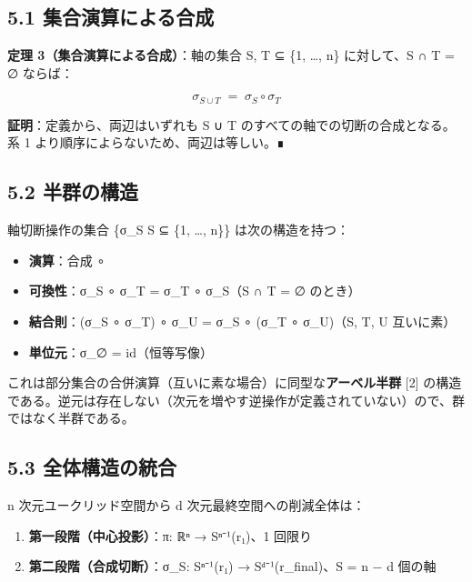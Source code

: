 \documentclass[a4paper,11pt]{ltjsarticle}
\theoremstyle{definition}
\theoremstyle{remark}
\providecommand{\tightlist}{%
  \setlength{\itemsep}{0pt}\setlength{\parskip}{0pt}}
\begin{document}
\subsection{5.1
集合演算による合成}\label{ux96c6ux5408ux6f14ux7b97ux306bux3088ux308bux5408ux6210}

\textbf{定理 3（集合演算による合成）}：軸の集合 S, T ⊆ \{1, \ldots, n\}
に対して、S ∩ T = ∅ ならば：

\[
\sigma_{S \cup T} \;=\; \sigma_S \circ \sigma_T
\]

\textbf{証明}：定義から、両辺はいずれも S ∪ T
のすべての軸での切断の合成となる。系 1
より順序によらないため、両辺は等しい。∎

\subsection{5.2 半群の構造}\label{ux534aux7fa4ux306eux69cbux9020}

軸切断操作の集合 \{σ\_S \textbar{} S ⊆ \{1, \ldots, n\}\}
は次の構造を持つ：

\begin{itemize}
\tightlist
\item
  \textbf{演算}：合成 ∘
\item
  \textbf{可換性}：σ\_S ∘ σ\_T = σ\_T ∘ σ\_S（S ∩ T = ∅ のとき）
\item
  \textbf{結合則}：(σ\_S ∘ σ\_T) ∘ σ\_U = σ\_S ∘ (σ\_T ∘ σ\_U)（S, T, U
  互いに素）
\item
  \textbf{単位元}：σ\_∅ = id（恒等写像）
\end{itemize}

これは部分集合の合併演算（互いに素な場合）に同型な\textbf{アーベル半群}
{[}2{]}
の構造である。逆元は存在しない（次元を増やす逆操作が定義されていない）ので、群ではなく半群である。

\subsection{5.3
全体構造の統合}\label{ux5168ux4f53ux69cbux9020ux306eux7d71ux5408}

n 次元ユークリッド空間から d 次元最終空間への削減全体は：

\begin{enumerate}
\def\labelenumi{\arabic{enumi}.}
\tightlist
\item
  \textbf{第一段階（中心投影）}：π: ℝⁿ → Sⁿ⁻¹(r₁)、1 回限り
\item
  \textbf{第二段階（合成切断）}：σ\_S: Sⁿ⁻¹(r₁) →
  Sᵈ⁻¹(r\_final)、\textbar S\textbar{} = n − d 個の軸
\end{enumerate}
\end{document}
